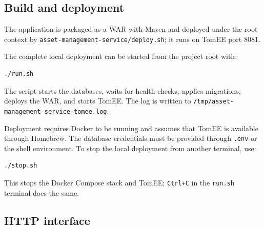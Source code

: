 \documentclass[12pt,a4paper]{article}
\newcommand{\code}[1]{\texttt{\small #1}}
\begin{document}
\subsection{Build and deployment}

The application is packaged as a WAR with Maven and deployed under the root
context by \code{asset-management-service/deploy.sh}; it runs on TomEE port
8081.

The complete local deployment can be started from the project root with:

\begin{verbatim}
./run.sh
\end{verbatim}

The script starts the databases, waits for health checks, applies migrations,
deploys the WAR, and starts TomEE. The log is written to
\code{/tmp/asset-management-service-tomee.log}.

Deployment requires Docker to be running and assumes that TomEE is available
through Homebrew. The database credentials must be provided through
\code{.env} or the shell environment. To stop the local deployment from
another terminal, use:

\begin{verbatim}
./stop.sh
\end{verbatim}

This stops the Docker Compose stack and TomEE; \code{Ctrl+C} in the
\code{run.sh} terminal does the same.

\subsection{HTTP interface}
\end{document}

